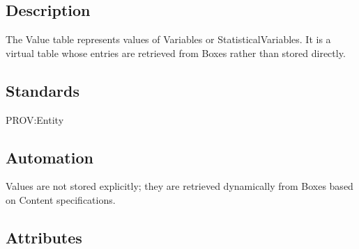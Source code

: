 \subsection{Description}\label{description-37}

The Value table represents values of Variables or StatisticalVariables.
It is a virtual table whose entries are retrieved from Boxes rather than
stored directly.

\subsection{Standards}\label{standards-39}

PROV:Entity

\subsection{Automation}\label{automation-39}

Values are not stored explicitly; they are retrieved dynamically from
Boxes based on Content specifications.

\subsection{Attributes}\label{attributes-33}

